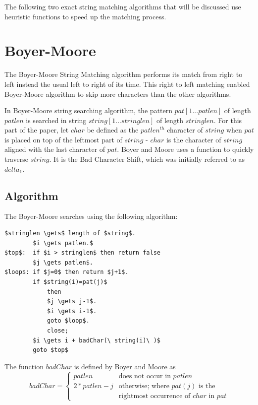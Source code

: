 The following two exact string matching algorithms that will be discussed use heuristic functions to speed up the matching process.

\section{Boyer-Moore}		%
The Boyer-Moore String Matching algorithm performs its match from right to left instead the usual left to right of its time. This right to left matching enabled Boyer-Moore algorithm to skip more characters than the other algorithms\cite{boyerMoore}.

In Boyer-Moore string searching algorithm, the pattern $pat[1 ... patlen]$ of length $patlen$ is searched in string $string[1 ... stringlen]$ of length $stringlen$. For this part of the paper, let $char$ be defined as the $patlen^{th}$ character of $string$ when $pat$ is placed on top of the leftmost part of $string$ - $char$ is the character of $string$ aligned with the last character of $pat$. Boyer and Moore uses a function to quickly traverse $string$. It is the Bad Character Shift, which was initially referred to as $delta_1$.\cite{boyerMoore}

\subsection{Algorithm}
The Boyer-Moore searches using the following algorithm:
\begin{lstlisting}[mathescape=true]
		$stringlen \gets$ length of $string$.
		$i \gets patlen.$
$top$:	if $i > stringlen$ then return false
		$j \gets patlen$.
$loop$:	if $j=0$ then return $j+1$.
		if $string(i)=pat(j)$
			then
			$j \gets j-1$.
			$i \gets i-1$.
			goto $loop$.
			close;
		$i \gets i + badChar(\ string(i)\ )$
		goto $top$
\end{lstlisting}

The function $badChar$ is defined by Boyer and Moore as\\

\begin{equation*}
  badChar =
  \begin{cases}
    patlen & \text{does not occur in $patlen$} \\
    2*patlen-j & \text{otherwise; where $pat(j)$ is the} \\
     & \text{rightmost occurrence of $char$ in $pat$}
  \end{cases}
\end{equation*}

